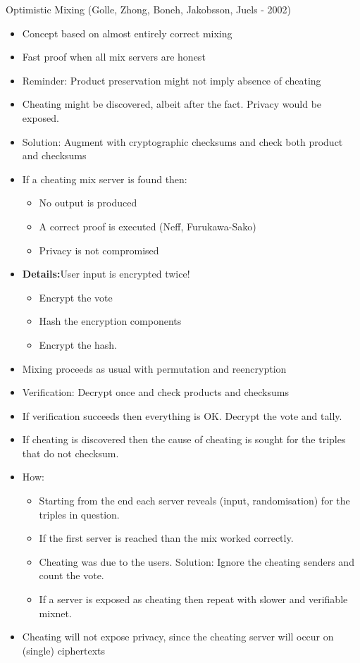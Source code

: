 \documentclass{beamer}
\begin{document}
\begin{frame}[allowframebreaks]{Optimistic Mixing (Golle, Zhong, Boneh, Jakobsson, Juels - 2002)}

\begin{itemize}
\item Concept based on almost entirely correct mixing
\item Fast proof when all mix servers are honest
\item Reminder: Product preservation might not imply absence of cheating
\item Cheating might be discovered, albeit after the fact. Privacy would be exposed.
\item Solution: Augment with cryptographic checksums and check both product and checksums
\item If a cheating mix server is found then:
\begin{itemize}
	\item No output is produced
	\item A correct proof is executed (Neff, Furukawa-Sako)
	\item Privacy is not compromised
\end{itemize}
\item \textbf{Details:}User input is encrypted twice!
\begin{itemize}
\item Encrypt the vote
\item Hash the encryption components
\item Encrypt the hash.
\end{itemize}
\item Mixing proceeds as usual with permutation and reencryption
\item Verification: Decrypt once and check products and checksums
\item If verification succeeds then everything is OK. Decrypt the vote and tally.
\item If cheating is discovered then the cause of cheating is sought for the triples that do not checksum.
\item How: 
\begin{itemize}
\item Starting from the end each server reveals  (input, randomisation) for the triples in question.
\item If the first server is reached than the mix worked correctly.
\item Cheating was due to the users. Solution: Ignore the cheating senders and count the vote.
\item If a server is exposed as cheating then repeat with slower and verifiable mixnet.
\end{itemize}
\item Cheating will not expose privacy, since the cheating server will occur on (single) ciphertexts
\end{itemize} 
\end{frame}
\end{document}
